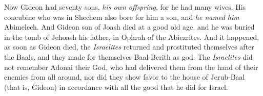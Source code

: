 \begin{biblechapter}
\verse Now Gideon had seventy sons, \textit{his own offspring}, for he had many wives.
\verse His concubine who was in Shechem also bore for him a son, and \textit{he named him} Abimelech.
\verse And Gideon son of Joash died at a good old age, and he was buried in the tomb of Jehoash his father, in Ophrah of the Abiezrites.
\verse And it happened, as soon as Gideon died, the \textit{Israelites} returned and prostituted themselves after the Baals, and they made for themselves Baal-Berith as god.
\verse The \textit{Israelites} did not remember Adonai their God, who had delivered them from the hand of their enemies from all around,
\verse nor did they show favor to the house of Jerub-Baal (that is, Gideon) in accordance with all the good that he did for Israel.
\end{biblechapter}

